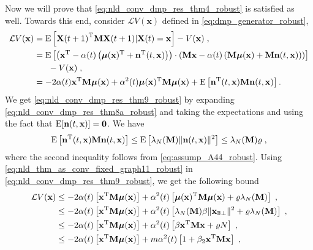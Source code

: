 \documentclass[onecolumn, draft, 12pt]{IEEEtran}
\newcommand{\vrho}{\ensuremath{\varrho}}
\newcommand{\E}{{\rm E}}
\newcommand{\Cs}{\mathbb{B}}
\newcommand{\Lg}{\mathcal{L}}
\newcommand{\Pm}{\mathbf{M}}
\newcommand{\Xcp}{\mathbf{x}_{\Cs \perp}}
\newcommand{\XPX}{{\mathbf{x}}^{\mathrm{T}} \mathbf{M} \mathbf{x}}
\newcommand{\XTMXt}{{\mathbf{X}(t+1)}^{\mathrm{T}} \mathbf{M} \mathbf{X}(t+1)}
\newcommand{\X}{\mathbf{X}}
\newcommand{\xX}{\mathbf{x}}
\newcommand{\mx}{\mathbf{\boldsymbol\mu}(\mathbf{x})}
\newcommand{\nv}{\mathbf{n}}
\newcommand{\vX}{ V(\mathbf{x})}
\begin{document}
\begin{IEEEproof}
Now we will prove that \eqref{eq:nld_conv_dmp_res_thm4_robust} is satisfied as well. Towards this end, consider $\Lg \vX $ defined in \eqref{eq:dmp_generator_robust},
\begin{align}
\label{eq:nld_conv_dmp_res_thm7a_robust}
\Lg \vX &= \E \left[ \XTMXt |\X(t)=\xX \right] - \vX \;, \\ 
\nonumber
		&= \E \left[ \left( \xX^{\rm T} - \alpha(t) \left( \mx^{\rm T} + \nv^{\rm T}(t,\xX) \right) \right) \cdot   \left(\Pm \xX - \alpha(t) \left( \Pm \mx + \Pm \nv(t,\xX)  \right) \right)  \right] \\
\label{eq:nld_conv_dmp_res_thm8a_robust}
		& \;\;\;\;\;\; - \vX \;, \\
\label{eq:nld_conv_dmp_res_thm9_robust}
		&= - 2 \alpha(t) \xX^{\rm T} \Pm \mx  + \alpha^2(t) \mx^{\rm T} \Pm \mx  + \E  \left[ \nv^{\rm T}(t,\xX) \Pm \nv(t,\xX)  \right] .
\end{align}
We get \eqref{eq:nld_conv_dmp_res_thm9_robust} by expanding \eqref{eq:nld_conv_dmp_res_thm8a_robust} and taking the expectations and using the fact that $\E [\nv(t, \xX)]=\mathbf{0}$. We have 
\begin{equation}
\label{eq:nld_thm_as_conv_fixed_graph11_robust}
\E  \left[ \nv^{\rm T}(t,\xX) \Pm \nv(t,\xX)  \right] \leq \E  \left[ \lambda_N (\Pm) \| \nv(t,\xX) \|^2 \right]   \leq \lambda_N (\Pm) \vrho \;,
\end{equation}
where the second inequality follows from \eqref{eq:assump_A44_robust}. Using \eqref{eq:nld_thm_as_conv_fixed_graph11_robust} in \eqref{eq:nld_conv_dmp_res_thm9_robust}, we get the following bound
\begin{align}
\label{eq:nld_thm_as_conv_fixed_graph12_robust}
\Lg \vX & \leq - 2 \alpha(t) \left[ \xX^{\rm T} \Pm \mx \right] + \alpha^2(t) \left[ \mx^{\rm T} \Pm \mx  +  \vrho \lambda_N (\Pm) \right] \;, \\
\label{eq:nld_thm_as_conv_fixed_graph13_robust}
		& \leq - 2 \alpha(t) \left[ \xX^{\rm T} \Pm \mx \right] + \alpha^2(t) \left[  \lambda_N(\Pm) \beta \| \Xcp \|^2  + \vrho \lambda_N (\Pm)  \right] \;, \\
\label{eq:nld_thm_as_conv_fixed_graph14_robust}
		& \leq - 2 \alpha(t) \left[ \xX^{\rm T} \Pm \mx \right] + \alpha^2(t) \left[ \beta  \XPX + \vrho N  \right] \;, \\ 
\label{eq:nld_thm_as_conv_fixed_graph15_robust}
		& \leq - 2 \alpha(t) \left[ \xX^{\rm T} \Pm \mx \right] + m  \alpha^2(t) \left[  1+ \beta_2 \XPX \right] \;, \\	
\label{eq:nld_thm_as_conv_fixed_graph16_robust}

\end{align}
\end{IEEEproof}
\end{document}
